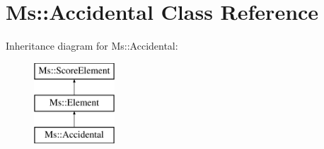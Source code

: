 \hypertarget{class_ms_1_1_accidental}{}\section{Ms\+:\+:Accidental Class Reference}
\label{class_ms_1_1_accidental}
Inheritance diagram for Ms\+:\+:Accidental\+:\begin{figure}[H]
\begin{center}
\leavevmode
\includegraphics[height=3.000000cm]{class_ms_1_1_accidental}
\end{center}
\end{figure}
